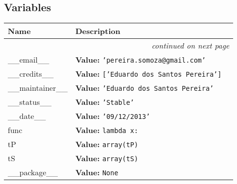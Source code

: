   \subsection{Variables}

    \vspace{-1cm}
\hspace{\varindent}\begin{longtable}{|p{\varnamewidth}|p{\vardescrwidth}|l}
\cline{1-2}
\cline{1-2} \centering \textbf{Name} & \centering \textbf{Description}& \\
\cline{1-2}
\endhead\cline{1-2}\multicolumn{3}{r}{\small\textit{continued on next page}}\\\endfoot\cline{1-2}
\endlastfoot\raggedright \_\-\_\-e\-m\-a\-i\-l\-\_\-\_\- & \raggedright \textbf{Value:} 
{\tt \texttt{'}\texttt{pereira.somoza@gmail.com}\texttt{'}}&\\
\cline{1-2}
\raggedright \_\-\_\-c\-r\-e\-d\-i\-t\-s\-\_\-\_\- & \raggedright \textbf{Value:} 
{\tt \texttt{[}\texttt{'}\texttt{Eduardo dos Santos Pereira}\texttt{'}\texttt{]}}&\\
\cline{1-2}
\raggedright \_\-\_\-m\-a\-i\-n\-t\-a\-i\-n\-e\-r\-\_\-\_\- & \raggedright \textbf{Value:} 
{\tt \texttt{'}\texttt{Eduardo dos Santos Pereira}\texttt{'}}&\\
\cline{1-2}
\raggedright \_\-\_\-s\-t\-a\-t\-u\-s\-\_\-\_\- & \raggedright \textbf{Value:} 
{\tt \texttt{'}\texttt{Stable}\texttt{'}}&\\
\cline{1-2}
\raggedright \_\-\_\-d\-a\-t\-e\-\_\-\_\- & \raggedright \textbf{Value:} 
{\tt \texttt{'}\texttt{09/12/2013}\texttt{'}}&\\
\cline{1-2}
\raggedright f\-u\-n\-c\- & \raggedright \textbf{Value:} 
{\tt lambda x:}&\\
\cline{1-2}
\raggedright t\-P\- & \raggedright \textbf{Value:} 
{\tt array(tP)}&\\
\cline{1-2}
\raggedright t\-S\- & \raggedright \textbf{Value:} 
{\tt array(tS)}&\\
\cline{1-2}
\raggedright \_\-\_\-p\-a\-c\-k\-a\-g\-e\-\_\-\_\- & \raggedright \textbf{Value:} 
{\tt None}&\\
\cline{1-2}
\end{longtable}




